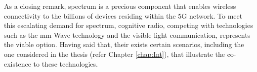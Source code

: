 As a closing remark, spectrum is a precious component that enables wireless connectivity to the billions of devices residing within the 5G network. To meet this escalating demand for spectrum, cognitive radio, competing with technologies such as the mm-Wave technology and the visible light communication, represents the viable option. Having said that, their exists certain scenarios, including the one considered in the thesis (refer Chapter \ref{chap:Int}), that illustrate the co-existence to these technologies. 







